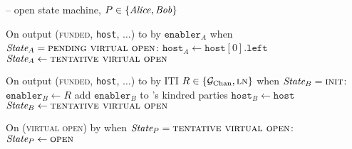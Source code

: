 \begin{center}
\begin{systembox}{\fchan{} -- open state machine, $P \in \{\mathit{Alice}, \mathit{Bob}\}$}
\begin{algorithmic}[1]
      \State On output (\textsc{funded}, \texttt{host}, $\dots$) to \alice by
      $\texttt{enabler}_A$ when $\itistate_A = \textsc{pending virtual open}$:
      \Indent
        \State $\texttt{host}_A \gets \texttt{host}[0].\texttt{left}$
        \State $\itistate_A \gets \textsc{tentative virtual open}$
      \EndIndent
      \Statex

      \State On output (\textsc{funded}, \texttt{host}, $\dots$) to \bob by ITI
      $R \in \{\mathcal{G}_{\mathrm{Chan}}, \textsc{ln}\}$ when $\itistate_B = \textsc{init}$:
      \Indent
        \State $\texttt{enabler}_B \gets R$
        \State add $\texttt{enabler}_B$ to \bob's kindred parties
        \State $\texttt{host}_B \gets \texttt{host}$
        \State $\itistate_B \gets \textsc{tentative virtual open}$
      \EndIndent
      \Statex

      \State On (\textsc{virtual open}) by \adversary when $\itistate_P =
      \textsc{tentative virtual open}$:
      \Indent
        \label{code:functionality:open:virtual-balance}
        \State $\itistate_P \gets \textsc{open}$
      \EndIndent
    \end{algorithmic}
  \end{systembox}
  \label{code:functionality:open}
\end{center} \ \\

